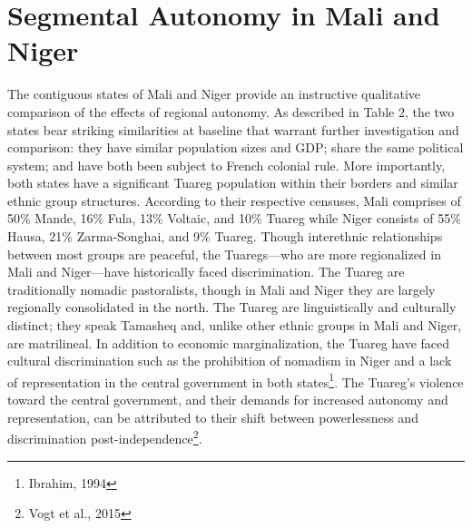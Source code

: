 \documentclass[12pt]{article}
\begin{document}
\section{Segmental Autonomy in Mali and Niger}
The contiguous states of Mali and Niger provide an instructive qualitative comparison of the effects of regional autonomy. As described in Table 2, the two states bear striking similarities at baseline that warrant further investigation and comparison: they have similar population sizes and GDP; share the same political system; and have both been subject to French colonial rule. More importantly, both states have a significant Tuareg population within their borders and similar ethnic group structures. According to their respective censuses, Mali comprises of 50\% Mande, 16\% Fula, 13\% Voltaic, and 10\% Tuareg while Niger consists of 55\% Hausa, 21\% Zarma-Songhai, and 9\% Tuareg. Though interethnic relationships between most groups are peaceful, the Tuaregs---who are more regionalized in Mali and Niger---have historically faced discrimination. The Tuareg are traditionally nomadic pastoralists, though in Mali and Niger they are largely regionally consolidated in the north. The Tuareg are linguistically and culturally distinct; they speak Tamasheq and, unlike other ethnic groups in Mali and Niger, are matrilineal. In addition to economic marginalization, the Tuareg have faced cultural discrimination such as the prohibition of nomadism in Niger and a lack of representation in the central government in both states\footnote{Ibrahim, 1994}. The Tuareg's violence toward the central government, and their demands for increased autonomy and representation, can be attributed to their shift between powerlessness and discrimination post-independence\footnote{Vogt et al., 2015}.  
\end{document}
